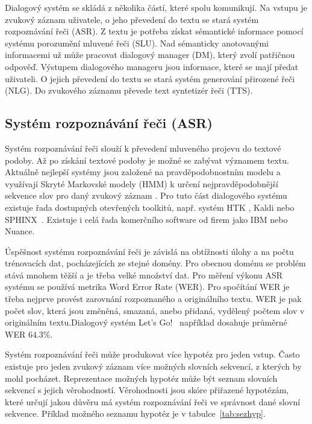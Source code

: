 Dialogový systém se skládá z několika částí, které spolu komunikují.
Na vstupu je zvukový záznam uživatele, o jeho převedení do textu se stará systém rozpoznávání řeči (ASR).
Z textu je potřeba získat sémantické informace pomocí systému porozumění mluvené řeči (SLU).
Nad sémanticky anotovanými informacemi už může pracovat dialogový manager (DM), který zvolí patřičnou odpověď.
Výstupem dialogového manageru jsou informace, které se mají předat uživateli.
O jejich převedení do textu se stará systém generování přirozené řeči (NLG).
Do zvukového záznamu převede text syntetizér řeči (TTS).

\subsection{Systém rozpoznávání řeči (ASR)}

Systém rozpoznávání řeči slouží k převedení mluveného projevu do textové podoby.
Až po získání textové podoby je možné se zabývat významem textu.
Aktuálně nejlepší systémy jsou založené na pravděpodobnostním modelu a využívají Skryté Markovské modely (HMM) k určení nejpravděpodobnější sekvence slov pro daný zvukový záznam \cite{juang1991hidden}.
Pro tuto část dialogového systému existuje řada dostupných otevřených toolkitů, např. systém HTK \cite{young2002htk}, Kaldi \cite{Povey_ASRU2011} nebo SPHINX~\cite{walker2004sphinx}.
Existuje i celá řada komerčního software od firem jako IBM nebo Nuance.

Úspěšnost systému rozpoznávání řeči je závislá na obtížnosti úlohy a na počtu trénovacích dat, pocházejících ze stejné domény.
Pro obecnou doménu se problém stává mnohem těžší a je třeba velké množství dat.
Pro měření výkonu ASR systému se používá metrika Word Error Rate (WER).
Pro spočítání WER je třeba nejprve provést zarovnání rozpoznaného a originálního textu.
WER je pak počet slov, která jsou změněná, smazaná, anebo přidaná, vydělený počtem slov v originálním textu.Dialogový systém Let's Go!~\cite{raux2006doing} například dosahuje průměrné WER $64.3\%$.

Systém rozpoznávání řeči může produkovat více hypotéz pro jeden vstup.
Často existuje pro jeden zvukový záznam více možných slovních sekvencí, z kterých by mohl pocházet.
Reprezentace možných hypotéz může být seznam slovních sekvencí s jejich věrohodností.
Věrohodnosti jsou skóre přiřazené hypotézám, které určují jakou důvěru má systém rozpoznávání řeči ve správnost dané slovní sekvence.
Příklad možného seznamu hypotéz je v tabulce~\ref{tab:sezhyp}.

